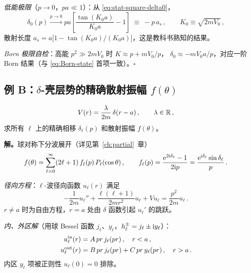 \emph{低能极限}（$p\to 0$，$pa\ll 1$）：从 \eqref{eq:stat-square-delta0}，
\begin{equation}
  \delta_0(p)\xrightarrow{p\to 0} pa\!\left[\frac{\tan(K_0 a)}{K_0 a} - 1\right]
  \;\equiv\; -p\,a_s\,,
  \qquad K_0\equiv\sqrt{2m V_0}\,,
\end{equation}
散射长度 $a_s = a\big[1 - \tan(K_0 a)/(K_0 a)\big]$，这是教科书熟知的结果。

\emph{Born 极限自检}：高能 $p^2\gg 2m V_0$ 时 $K\approx p + m V_0/p$，
$\delta_0\approx -m V_0 a/p$，对应一阶 Born 结果（与 \eqref{eq:Born-state}
首项一致）。$\square$

\subsection{例 B：$\delta$-壳层势的精确散射振幅 $f(\theta)$}
\label{sec:stat-ex-shell}

\begin{example}\label{ex:shell}
\begin{equation}
  V(r) = \frac{\lambda}{2m}\,\delta(r-a)\,,
  \qquad \lambda\in\mathbb{R}\,,
  \label{eq:stat-shell-V}
\end{equation}
求所有 $\ell$ 上的精确相移 $\delta_\ell(p)$ 和散射振幅 $f(\theta)$。
\end{example}

\textbf{解。}\quad 球对称下分波展开（详见第~\ref{ch:partial}~章）
\begin{equation}
  f(\theta) = \sum_{\ell=0}^\infty (2\ell+1)\,f_\ell(p)\,P_\ell(\cos\theta)\,,
  \qquad
  f_\ell(p) = \frac{\mathrm{e}^{2\mathrm{i}\delta_\ell}-1}{2\mathrm{i} p}
  = \frac{\mathrm{e}^{\mathrm{i}\delta_\ell}\sin\delta_\ell}{p}\,.
\end{equation}

\emph{径向方程}：$\ell$-波径向函数 $u_\ell(r)$ 满足
\begin{equation}
  -\frac{1}{2m}u_\ell'' + \frac{\ell(\ell+1)}{2m r^2}u_\ell + V u_\ell = \frac{p^2}{2m}u_\ell\,.
\end{equation}
$r\ne a$ 时为自由方程，$r=a$ 处由 $\delta$ 函数引起 $u_\ell'$ 的跳跃。

\emph{内、外区解}（用球 Bessel 函数 $j_\ell$、$y_\ell$，$h_\ell^{\pm}=j_\ell\pm\mathrm{i} y_\ell$）：
\begin{align}
  u_\ell^{\rm in}(r) &= A\,p r\,j_\ell(pr)\,,\quad r<a\,,\\
  u_\ell^{\rm out}(r) &= B\,p r\,j_\ell(pr) + C\,p r\,y_\ell(pr)\,,\quad r>a\,.
\end{align}
内区 $y_\ell$ 项被正则性 $u_\ell(0)=0$ 排除。

